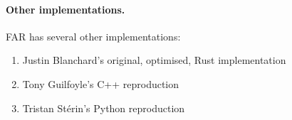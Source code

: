 \paragraph{Other implementations.} FAR has several other implementations:

\begin{enumerate}
    \item Justin Blanchard's original, optimised, Rust implementation \cite{FAR}
    \item Tony Guilfoyle's C++ reproduction \cite{FAR_Tony}
    \item Tristan Stérin's Python reproduction \cite{FAR_cosmo}
\end{enumerate}





